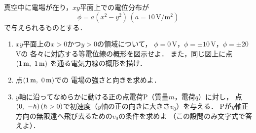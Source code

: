 \documentclass[../../../all/physics-standard_questions_all.tex]{subfiles}
\begin{document}
\setlength{\abovedisplayskip}{0mm}
\setlength{\belowdisplayskip}{0mm}

真空中に電場が在り，$xy$平面上での電位分布が
\[ \phi=a(x^2-y^2)\,(a=10\,\text{V/}\text{m}^2) \]
で与えられるものとする．

\begin{enumerate}
    
    \item $xy$平面上の$x>0$かつ$y>0$の領域について，
    $\phi=0$\,V，$\phi=\pm10$\,V，$\phi=\pm20$\,Vの
    各々に対応する等電位線の概形を図示せよ．
    また，同じ図上に点$(1\,\text{m}, \hspace{1.2mm}1\,\text{m})$
    を通る電気力線の概形を描け．

    \item 点$(1\,\text{m}, \hspace{1.2mm}0\,\text{m})$での
    電場の強さと向きを求めよ．

    \item $y$軸に沿ってなめらかに動ける正の点電荷P（質量$m$，電荷$q$）に対し，
    点$(0, \hspace{1.2mm}-h)\,(h>0)$で初速度（$y$軸の正の向きに大きさ$v_0$）を与える．
    Pが$y$軸正方向の無限遠へ飛び去るための$v_0$の条件を求めよ
    （この設問のみ文字式で答えよ）．

\end{enumerate}
\end{document}
